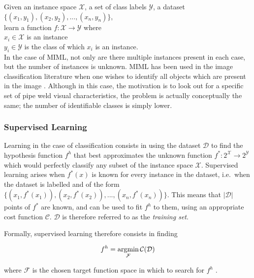 \documentclass[a4paper,11pt]{article}
\begin{document}
\indent Given an instance space $\mathcal{X}$, a set of class labels $\mathcal{Y}$, a dataset $\{(x_{1},y_{1}),(x_{2},y_{2}), ..., (x_{n},y_{n})\}$,\\ 
\indent learn a function $f : \mathcal{X} \rightarrow \mathcal{Y}$ where\\  
\indent \indent $x_{i} \in \mathcal{X}$ is an instance \\   
\indent \indent $y_{	i} \in \mathcal{Y}$ is the class of which $x_{i}$ is an instance.\\

In the case of MIML, not only are there multiple instances present in each case, but the number of instances is unknown. MIML has been used in the image classification literature when one wishes to identify all objects which are present in the image \cite{MIML}. Although in this case, the motivation is to look out for a specific set of pipe weld visual characteristics, the problem is actually conceptually the same; the number of identifiable classes is simply lower.

\subsubsection{Supervised Learning}

Learning in the case of classification consists in using the dataset $\mathcal{D}$ to find the hypothesis function $f^{h}$ that best approximates the unknown function $f^{*} : 2^{\mathcal{X}} \rightarrow 2^{\mathcal{Y}}$ which would perfectly classify any subset of the instance space $\mathcal{X}$. Supervised learning arises when $f^{*}(x)$ is known for every instance in the dataset, i.e.\ when the dataset is labelled and of the form $\{(x_{1},f^{*}(x_{1})),(x_{2},f^{*}(x_{2})), ..., (x_{n},f^{*}(x_{n}))\}$. This means that $|\mathcal{D}|$ points of $f^{*}$ are known, and can be used to fit $f^{h}$ to them, using an appropriate cost function $\mathcal{C}$. $\mathcal{D}$ is therefore referred to as the \textit{training set}. 

Formally, supervised learning therefore consists in finding

\begin{equation}
\label{learning: optimisation equation}
  f^{h} = \operatornamewithlimits{argmin}\limits_{\mathcal{F}}\operatorname{\mathcal{C}}(\mathcal{D})
\end{equation}
  
where $\mathcal{F}$ is the chosen target function space in which to search for $f^{h}$ . \\
\end{document}
